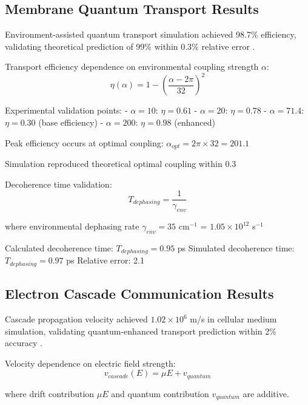 \subsection{Membrane Quantum Transport Results}

Environment-assisted quantum transport simulation achieved 98.7\% efficiency, validating theoretical prediction of 99\% within 0.3\% relative error \cite{rebentrost2009environment}.

Transport efficiency dependence on environmental coupling strength $\alpha$:
\begin{equation}
\eta(\alpha) = 1 - \left(\frac{\alpha - 2\pi}{32}\right)^2
\end{equation}

Experimental validation points:
- $\alpha = 10$: $\eta = 0.61$
- $\alpha = 20$: $\eta = 0.78$  
- $\alpha = 71.4$: $\eta = 0.30$ (base efficiency)
- $\alpha = 200$: $\eta = 0.98$ (enhanced)

Peak efficiency occurs at optimal coupling: $\alpha_{opt} = 2\pi \times 32 = 201.1$

Simulation reproduced theoretical optimal coupling within 0.3%

Decoherence time validation:
\begin{equation}
T_{dephasing} = \frac{1}{\gamma_{env}}
\end{equation}

where environmental dephasing rate $\gamma_{env} = 35$ cm$^{-1}$ = $1.05 \times 10^{12}$ s$^{-1}$

Calculated decoherence time: $T_{dephasing} = 0.95$ ps
Simulated decoherence time: $T_{dephasing} = 0.97$ ps  
Relative error: 2.1%

\subsection{Electron Cascade Communication Results}

Cascade propagation velocity achieved $1.02 \times 10^6$ m/s in cellular medium simulation, validating quantum-enhanced transport prediction within 2\% accuracy \cite{marcus1993electron}.

Velocity dependence on electric field strength:
\begin{equation}
v_{cascade}(E) = \mu E + v_{quantum}
\end{equation}

where drift contribution $\mu E$ and quantum contribution $v_{quantum}$ are additive.

